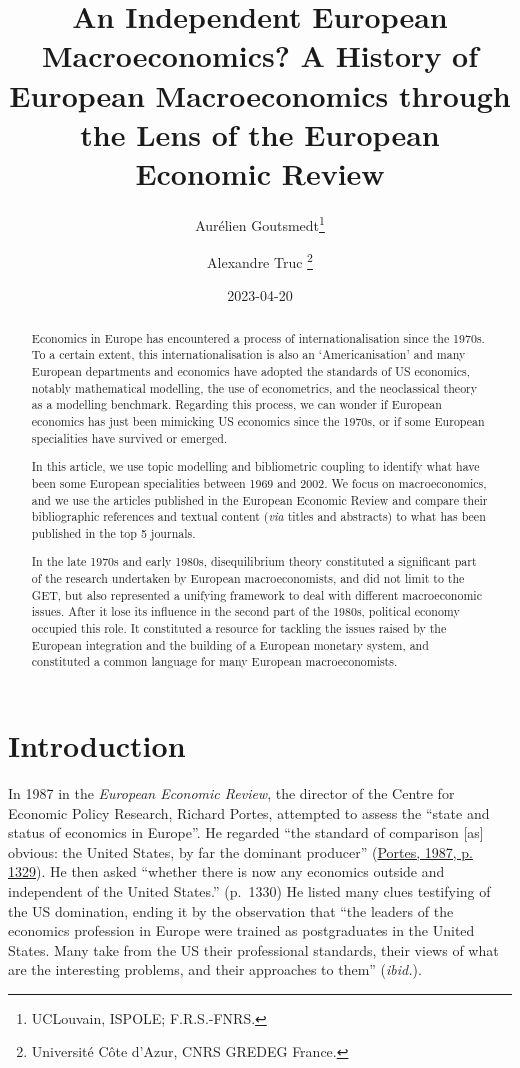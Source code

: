 \documentclass[
  12pt,
  onecolumn]{article}
\title{An Independent European Macroeconomics? A History of European
Macroeconomics through the Lens of the European Economic Review}
\author{Aurélien Goutsmedt\footnote{UCLouvain, ISPOLE; F.R.S.-FNRS.} \and Alexandre
Truc \footnote{Université Côte d'Azur, CNRS GREDEG France.}}
\date{2023-04-20}
\begin{document}
\maketitle
\begin{abstract}
Economics in Europe has encountered a process of internationalisation
since the 1970s. To a certain extent, this internationalisation is also
an `Americanisation' and many European departments and economics have
adopted the standards of US economics, notably mathematical modelling,
the use of econometrics, and the neoclassical theory as a modelling
benchmark. Regarding this process, we can wonder if European economics
has just been mimicking US economics since the 1970s, or if some
European specialities have survived or emerged.

In this article, we use topic modelling and bibliometric coupling to
identify what have been some European specialities between 1969 and
2002. We focus on macroeconomics, and we use the articles published in
the European Economic Review and compare their bibliographic references
and textual content (\emph{via} titles and abstracts) to what has been
published in the top 5 journals.

In the late 1970s and early 1980s, disequilibrium theory constituted a
significant part of the research undertaken by European macroeconomists,
and did not limit to the GET, but also represented a unifying framework
to deal with different macroeconomic issues. After it lose its influence
in the second part of the 1980s, political economy occupied this role.
It constituted a resource for tackling the issues raised by the European
integration and the building of a European monetary system, and
constituted a common language for many European macroeconomists.
\end{abstract}

\hypertarget{introduction}{%
\section{Introduction}\label{introduction}}

In 1987 in the \emph{European Economic Review}, the director of the
Centre for Economic Policy Research, Richard Portes, attempted to assess
the ``state and status of economics in Europe''. He regarded ``the
standard of comparison {[}as{]} obvious: the United States, by far the
dominant producer'' (\protect\hyperlink{ref-portes1987}{Portes, 1987, p.
1329}). He then asked ``whether there is now any economics outside and
independent of the United States.'' (p.~1330) He listed many clues
testifying of the US domination, ending it by the observation that ``the
leaders of the economics profession in Europe were trained as
postgraduates in the United States. Many take from the US their
professional standards, their views of what are the interesting
problems, and their approaches to them'' (\emph{ibid.}).
\end{document}
